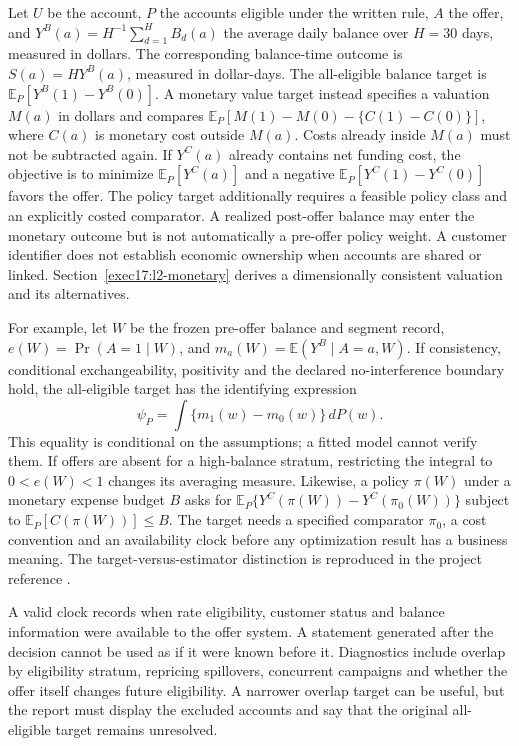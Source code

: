 Let $U$ be the account, $P$ the accounts eligible under the written rule, $A$ the offer, and $Y^B(a)=H^{-1}\sum_{d=1}^H B_d(a)$ the average daily balance over $H=30$ days, measured in dollars. The corresponding balance-time outcome is $S(a)=H Y^B(a)$, measured in dollar-days. The all-eligible balance target is $\mathbb E_P[Y^B(1)-Y^B(0)]$. A monetary value target instead specifies a valuation $M(a)$ in dollars and compares $\mathbb E_P[M(1)-M(0)-\{C(1)-C(0)\}]$, where $C(a)$ is monetary cost outside $M(a)$. Costs already inside $M(a)$ must not be subtracted again. If $Y^C(a)$ already contains net funding cost, the objective is to minimize $\mathbb E_P[Y^C(a)]$ and a negative $\mathbb E_P[Y^C(1)-Y^C(0)]$ favors the offer. The policy target additionally requires a feasible policy class and an explicitly costed comparator. A realized post-offer balance may enter the monetary outcome but is not automatically a pre-offer policy weight. A customer identifier does not establish economic ownership when accounts are shared or linked. Section~\ref{exec17:l2-monetary} derives a dimensionally consistent valuation and its alternatives.

For example, let $W$ be the frozen pre-offer balance and segment record, $e(W)=\Pr(A=1\mid W)$, and $m_a(W)=\mathbb E(Y^B\mid A=a,W)$. If consistency, conditional exchangeability, positivity and the declared no-interference boundary hold, the all-eligible target has the identifying expression
\[
 \psi_P=\int\{m_1(w)-m_0(w)\}\,dP(w).
\]
This equality is conditional on the assumptions; a fitted model cannot verify them. If offers are absent for a high-balance stratum, restricting the integral to $0<e(W)<1$ changes its averaging measure. Likewise, a policy $\pi(W)$ under a monetary expense budget $B$ asks for $\mathbb E_P\{Y^C(\pi(W))-Y^C(\pi_0(W))\}$ subject to $\mathbb E_P[C(\pi(W))]\leq B$. The target needs a specified comparator $\pi_0$, a cost convention and an availability clock before any optimization result has a business meaning. The target-versus-estimator distinction is reproduced in the project reference \citep{exec13_formulation_targets}.

A valid clock records when rate eligibility, customer status and balance information were available to the offer system. A statement generated after the decision cannot be used as if it were known before it. Diagnostics include overlap by eligibility stratum, repricing spillovers, concurrent campaigns and whether the offer itself changes future eligibility. A narrower overlap target can be useful, but the report must display the excluded accounts and say that the original all-eligible target remains unresolved.

